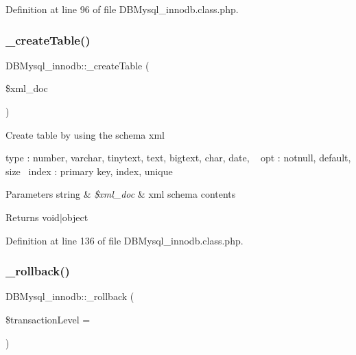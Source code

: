 Definition at line 96 of file D\+B\+Mysql\+\_\+innodb.\+class.\+php.

\hypertarget{classDBMysql__innodb_aa2b634992fbfaaadea5c897b8810b87c}{}\label{classDBMysql__innodb_aa2b634992fbfaaadea5c897b8810b87c} 
\subsubsection{\texorpdfstring{\+\_\+create\+Table()}{\_createTable()}}
{\footnotesize\ttfamily D\+B\+Mysql\+\_\+innodb\+::\+\_\+create\+Table (\begin{DoxyParamCaption}\item[{}]{\$xml\+\_\+doc }\end{DoxyParamCaption})}

Create table by using the schema xml

type \+: number, varchar, tinytext, text, bigtext, char, date, ~\newline
opt \+: notnull, default, size~\newline
index \+: primary key, index, unique~\newline

\begin{DoxyParams}[1]{Parameters}
string & {\em \$xml\+\_\+doc} & xml schema contents \\
\hline
\end{DoxyParams}
\begin{DoxyReturn}{Returns}
void$\vert$object 
\end{DoxyReturn}


Definition at line 136 of file D\+B\+Mysql\+\_\+innodb.\+class.\+php.

\hypertarget{classDBMysql__innodb_a36779df768253f967560eee5a8c1ae89}{}\label{classDBMysql__innodb_a36779df768253f967560eee5a8c1ae89} 
\subsubsection{\texorpdfstring{\+\_\+rollback()}{\_rollback()}}
{\footnotesize\ttfamily D\+B\+Mysql\+\_\+innodb\+::\+\_\+rollback (\begin{DoxyParamCaption}\item[{}]{\$transaction\+Level = {} }\end{DoxyParamCaption})}

